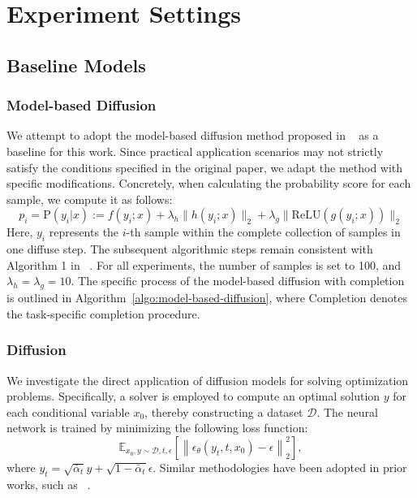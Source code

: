 \onecolumn
\section{Experiment Settings}
\subsection{Baseline Models}
\label{appendix:baseline}
\subsubsection{Model-based Diffusion}
\label{appendix:mbd}

We attempt to adopt the model-based diffusion method proposed in ~\cite{pan2024model} as a baseline for this work. Since practical application scenarios may not strictly satisfy the conditions specified in the original paper, we adapt the method with specific modifications. Concretely, when calculating the probability score for each sample, we compute it as follows:  
\begin{equation}
p_i =\mathrm{P}(y_i|x) := f(y_i;x) + \lambda_h \|h(y_i;x)\|_2 + \lambda_g \|\mathrm{ReLU}(g(y_i;x))\|_2
\end{equation}
Here, \( y_i \) represents the \( i \)-th sample within the complete collection of samples in one diffuse step. The subsequent algorithmic steps remain consistent with Algorithm 1 in ~\cite{pan2024model}. For all experiments, the number of samples is set to 100, and \(\lambda_h=\lambda_g=10\).  The specific process of the model-based diffusion with completion is outlined in Algorithm~\ref{algo:model-based-diffusion}, where $\mathrm{Completion}$ denotes the task-specific completion procedure.

\subsubsection{Diffusion}
We investigate the direct application of diffusion models for solving optimization problems. Specifically, a solver is employed to compute an optimal solution \( y \) for each conditional variable \( x_0 \), thereby constructing a dataset \( \mathcal{D} \). The neural network is trained by minimizing the following loss function:  
\begin{equation}
\mathbb{E}_{x_0, y\sim \mathcal{D}, t, \epsilon}\left[\left\|\epsilon_\theta(y_t, t, x_0) - \epsilon\right\|_2^2 \right],
\end{equation}
where \( y_t = \sqrt{\bar{\alpha}_t}y + \sqrt{1- \bar{\alpha}_t}\epsilon \). Similar methodologies have been adopted in prior works, such as ~\cite{li2024diffusolve, graebner2024learning}.

